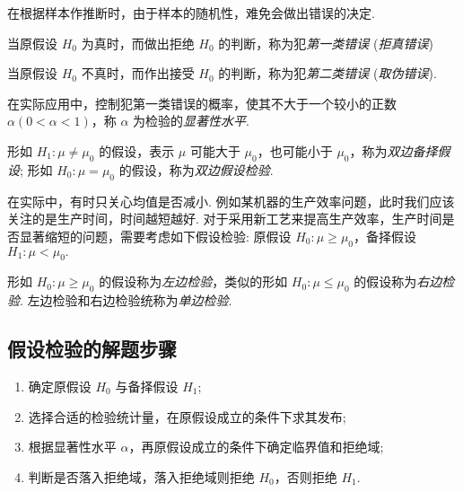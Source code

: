 在根据样本作推断时，由于样本的随机性，难免会做出错误的决定.

\begin{definition}[第一类错误]
    当原假设 $ H_{0} $ 为真时，而做出拒绝 $ H_{0} $ 的判断，称为犯\textit{第一类错误} (\textit{拒真错误})
\end{definition}

\begin{definition}[第二类错误]
    当原假设 $ H_{0} $ 不真时，而作出接受 $ H_{0} $ 的判断，称为犯\textit{第二类错误} (\textit{取伪错误}).
\end{definition}

\begin{definition}[显著性水平]
    在实际应用中，控制犯第一类错误的概率，使其不大于一个较小的正数 $ \alpha(0<\alpha<1)$，称 $ \alpha $ 为检验的\textit{显著性水平}.
\end{definition}

\begin{definition}[双边备择假设与双边假设检验]
    形如 $ H_{1}: \mu \neq \mu_{0} $ 的假设，表示 $ \mu $ 可能大于 $ \mu_{0} $，也可能小于 $ \mu_{0}$，称为\textit{双边备择假设};
    形如 $ H_{0}: \mu=\mu_{0} $ 的假设，称为\textit{双边假设检验}.
\end{definition}

在实际中，有时只关心均值是否减小. 例如某机器的生产效率问题，此时我们应该关注的是生产时间，时间越短越好.
对于采用新工艺来提高生产效率，生产时间是否显著缩短的问题，需要考虑如下假设检验:
原假设 $ H_{0}: \mu \geqslant \mu_{0}$，备择假设 $ H_{1}: \mu<\mu_{0} .$

\begin{definition}[单边检验]
    形如 $ H_{0}: \mu \geqslant \mu_{0} $ 的假设称为\textit{左边检验}，类似的形如 $ H_{0}: \mu \leqslant \mu_{0} $ 的假设称为\textit{右边检验}.
    左边检验和右边检验统称为\textit{单边检验}.
\end{definition}

\subsection{假设检验的解题步骤}

\begin{enumerate}[label=(\arabic{*})]
    \item 确定原假设 $H_0$ 与备择假设 $H_1$;
    \item 选择合适的检验统计量，在原假设成立的条件下求其发布;
    \item 根据显著性水平 $\alpha$，再原假设成立的条件下确定临界值和拒绝域;
    \item 判断是否落入拒绝域，落入拒绝域则拒绝 $H_0$，否则拒绝 $H_1$.
\end{enumerate}


